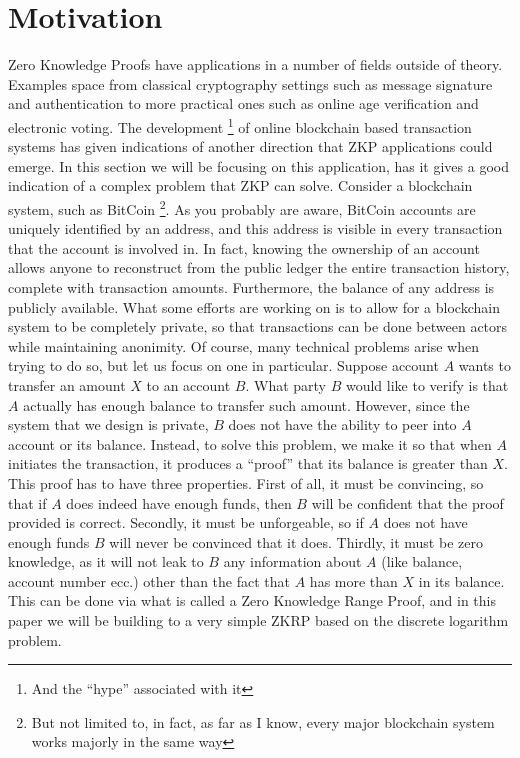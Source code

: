 \documentclass{article}
\begin{document}
\section{Motivation}
\label{motivation}
Zero Knowledge Proofs have applications in a number of fields outside of theory.
Examples space from classical cryptography settings such as message signature and authentication to more
practical ones such as online age verification and electronic voting. The development
\footnote{And the \enquote{hype} associated with it}
of online blockchain based transaction systems has given indications of another direction that ZKP applications could
emerge. In this section we will be focusing on this application, has it gives a good indication of a complex problem that
ZKP can solve. Consider a blockchain system, such as BitCoin
\footnote{But not limited to, in fact, as far as I know, every major blockchain system works majorly in the same way}.
As you probably are aware, BitCoin accounts are uniquely identified
by an address, and this address is visible in every transaction that the account is involved in. In fact, knowing the ownership
of an account allows anyone to reconstruct from the public ledger the entire transaction history, complete with transaction
amounts. Furthermore, the balance of any address is publicly available. What some efforts are working on is to allow
for a blockchain system to be completely private, so that transactions can be done between actors while maintaining
anonimity. Of course, many technical problems arise when trying to do so, but let us focus on one in particular.
Suppose account $A$ wants to transfer an amount $X$ to an account $B$. What party $B$ would like to verify is that
$A$ actually has enough balance to transfer such amount. However, since the system that we design is private, $B$ does
not have the ability to peer into $A$ account or its balance. Instead, to solve this problem, we make it so that
when $A$ initiates the transaction, it produces a \enquote{proof} that its balance is greater than $X$.
This proof has to have three properties. First of all, it must be convincing, so that if $A$ does indeed have
enough funds, then $B$ will be confident that the proof provided is correct. Secondly, it must be
unforgeable, so if $A$ does not have enough funds $B$ will never be convinced that it does. Thirdly, it must
be zero knowledge, as it will not leak to $B$ any information about $A$ (like balance, account number ecc.) other
than the fact that $A$ has more than $X$ in its balance. This can be done via what is called a Zero Knowledge Range Proof,
and in this paper we will be building to a very simple ZKRP based on the discrete logarithm problem.
\end{document}
